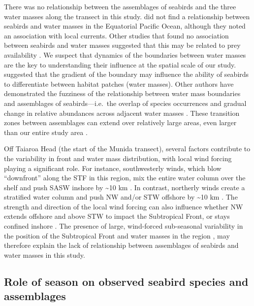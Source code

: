 \documentclass[preprint, 3p, authoryear]{elsarticle} %
\begin{document}
There was no relationship between the assemblages of seabirds and the three water masses along the transect in this study. \citet{ribic1997} did not find a relationship between seabirds and water masses in the Equatorial Pacific Ocean, although they noted an association with local currents. Other studies that found no association between seabirds and water masses suggested that this may be related to prey availability \citep[e.g.][]{haney1986, elphick1993}. We suspect that dynamics of the boundaries between water masses are the key to understanding their influence at the spatial scale of our study. \citet{elphick1993} suggested that the gradient of the boundary may influence the ability of seabirds to differentiate between habitat patches (water masses). Other authors have demonstrated the fuzziness of the relationship between water mass boundaries and assemblages of seabirds---i.e.~the overlap of species occurrences and gradual change in relative abundances across adjacent water masses \citep{wahl1989, hay1992}. These transition zones between assemblages can extend over relatively large areas, even larger than our entire study area \citep[e.g.][]{spear2001, daudt2024}.

Off Taiaroa Head (the start of the Munida transect), several factors contribute to the variability in front and water mass distribution, with local wind forcing playing a significant role. For instance, southwesterly winds, which blow ``downfront'' along the STF in this region, mix the entire water column over the shelf and push SASW inshore by \textasciitilde10 km \citep{johnson2023}. In contrast, northerly winds create a stratified water column and push NW and/or STW offshore by \textasciitilde10 km \citep{johnson2023}. The strength and direction of the local wind forcing can also influence whether NW extends offshore and above STW to impact the Subtropical Front, or stays confined inshore \citep{johnson2024}. The presence of large, wind-forced sub-seasonal variability in the position of the Subtropical Front and water masses in the region \citep{johnson2023, johnson2024}, may therefore explain the lack of relationship between assemblages of seabirds and water masses in this study.

\hypertarget{role-of-season-on-observed-seabird-species-and-assemblages}{%
\subsection{Role of season on observed seabird species and assemblages}\label{role-of-season-on-observed-seabird-species-and-assemblages}}
\end{document}
